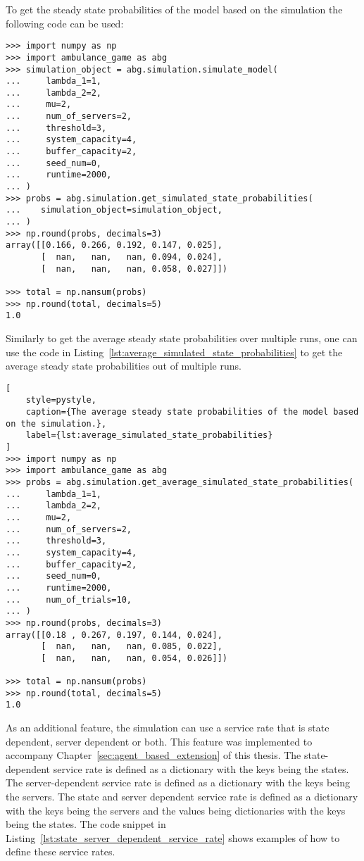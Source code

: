 To get the steady state probabilities of the model based on the simulation the
following code can be used:

\begin{lstlisting}[style=pystyle]
>>> import numpy as np
>>> import ambulance_game as abg
>>> simulation_object = abg.simulation.simulate_model(
...     lambda_1=1,
...     lambda_2=2,
...     mu=2,
...     num_of_servers=2,
...     threshold=3,
...     system_capacity=4,
...     buffer_capacity=2,
...     seed_num=0,
...     runtime=2000,
... )
>>> probs = abg.simulation.get_simulated_state_probabilities(
...    simulation_object=simulation_object,
... )
>>> np.round(probs, decimals=3)
array([[0.166, 0.266, 0.192, 0.147, 0.025],
       [  nan,   nan,   nan, 0.094, 0.024],
       [  nan,   nan,   nan, 0.058, 0.027]])

>>> total = np.nansum(probs)
>>> np.round(total, decimals=5)
1.0

\end{lstlisting}

Similarly to get the average steady state probabilities over multiple runs,
one can use the code in Listing~\ref{lst:average_simulated_state_probabilities}
to get the average steady state probabilities out of multiple runs.

\begin{lstlisting}[
    style=pystyle,
    caption={The average steady state probabilities of the model based on the simulation.},
    label={lst:average_simulated_state_probabilities}
]
>>> import numpy as np
>>> import ambulance_game as abg
>>> probs = abg.simulation.get_average_simulated_state_probabilities(
...     lambda_1=1,
...     lambda_2=2,
...     mu=2,
...     num_of_servers=2,
...     threshold=3,
...     system_capacity=4,
...     buffer_capacity=2,
...     seed_num=0,
...     runtime=2000,
...     num_of_trials=10,
... )
>>> np.round(probs, decimals=3)
array([[0.18 , 0.267, 0.197, 0.144, 0.024],
       [  nan,   nan,   nan, 0.085, 0.022],
       [  nan,   nan,   nan, 0.054, 0.026]])

>>> total = np.nansum(probs)
>>> np.round(total, decimals=5)
1.0

\end{lstlisting}

As an additional feature, the simulation can use a service rate that is state
dependent, server dependent or both.
This feature was implemented to accompany
Chapter~\ref{sec:agent_based_extension} of this thesis.
The state-dependent service rate is defined as a dictionary with the keys
being the states.
The server-dependent service rate is defined as a dictionary with the keys
being the servers.
The state and server dependent service rate is defined as a dictionary with
the keys being the servers and the values being dictionaries with the keys
being the states.
The code snippet in Listing~\ref{lst:state_server_dependent_service_rate} shows
examples of how to define these service rates.

